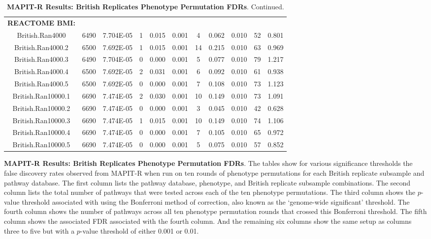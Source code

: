 \documentclass[12pt, a4paper]{article}
\begin{document}
\begin{landscape}
\begin{table}[ht]
\begin{tabular}{ccccccccccc}
  \\
  \textbf{REACTOME BMI:} & & & & & & & & & \\
British.Ran4000 & 6490 & 7.704E-05 & 1 & 0.015 & 0.001 & 4 & 0.062 & 0.010 & 52 & 0.801 \\
  British.Ran4000.2 & 6500 & 7.692E-05 & 1 & 0.015 & 0.001 & 14 & 0.215 & 0.010 & 63 & 0.969 \\
  British.Ran4000.3 & 6490 & 7.704E-05 & 0 & 0.000 & 0.001 & 5 & 0.077 & 0.010 & 79 & 1.217 \\
  British.Ran4000.4 & 6500 & 7.692E-05 & 2 & 0.031 & 0.001 & 6 & 0.092 & 0.010 & 61 & 0.938 \\
  British.Ran4000.5 & 6500 & 7.692E-05 & 0 & 0.000 & 0.001 & 7 & 0.108 & 0.010 & 73 & 1.123 \\
  British.Ran10000.1 & 6690 & 7.474E-05 & 2 & 0.030 & 0.001 & 10 & 0.149 & 0.010 & 73 & 1.091 \\
  British.Ran10000.2 & 6690 & 7.474E-05 & 0 & 0.000 & 0.001 & 3 & 0.045 & 0.010 & 42 & 0.628 \\
  British.Ran10000.3 & 6690 & 7.474E-05 & 1 & 0.015 & 0.001 & 10 & 0.149 & 0.010 & 74 & 1.106 \\
  British.Ran10000.4 & 6690 & 7.474E-05 & 0 & 0.000 & 0.001 & 7 & 0.105 & 0.010 & 65 & 0.972 \\
  British.Ran10000.5 & 6690 & 7.474E-05 & 0 & 0.000 & 0.001 & 5 & 0.075 & 0.010 & 57 & 0.852 \\
   \hline
\end{tabular}
\caption[TBD]{\textbf{MAPIT-R Results: British Replicates Phenotype Permutation FDRs}. Continued.}
\label{InterPath-Supp-Tables-BritReps-FDRs-pt2}
\end{table}
\end{landscape}
\clearpage
\setlength{\footskip}{1cm}

\addtocounter{table}{-1}
\begin{table} [t!]
  \caption{\textbf{MAPIT-R Results: British Replicates Phenotype Permutation FDRs}. The tables show for various significance thresholds the false discovery rates observed from MAPIT-R when run on ten rounds of phenotype permutations for each British replicate subsample and pathway database. The first column lists the pathway database, phenotype, and British replicate subsample combinations. The second column lists the total number of pathways that were tested across each of the ten phenotype permutations. The third column shows the $p$-value threshold associated with using the Bonferroni method of correction, also known as the `genome-wide significant' threshold. The fourth column shows the number of pathways across all ten phenotype permutation rounds that crossed this Bonferroni threshold. The fifth column shows the associated FDR associated with the fourth column. And the remaining six columns show the same setup as columns three to five but with a $p$-value threshold of either 0.001 or 0.01.}
\label{InterPath-Supp-Tables-BritReps-FDRs-Caption}
\end{table}
\clearpage
\end{document}
